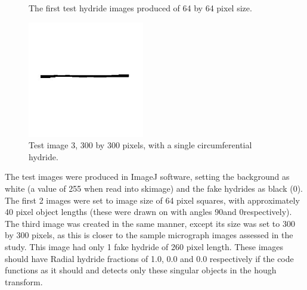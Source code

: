 \documentclass{article}
\begin{document}
\begin{figure}[h]
		\begin{center}
		\hspace{6pt} 
		\caption{The first test hydride images produced of 64 by 64 pixel size.}
		\label{TestImages64}
		\end{center}
	\end{figure}

\begin{figure}[h]
    \begin{center}
    \includegraphics[width=2.0in]{Figures/Test_3.jpg} 
    \caption{Test image 3, 300 by 300 pixels, with a single circumferential hydride.}
    \label{TestImage300}
    \end{center}
\end{figure}

The test images were produced in ImageJ software, setting the background as white (a value of 255 when read into skimage) and the fake hydrides as black (0). The first 2 images were set to image size of 64 pixel squares, with approximately 40 pixel object lengths (these were drawn on with angles 90\degree and 0\degree respectively). The third image was created in the same manner, except its size was set to 300 by 300 pixels, as this is closer to the sample micrograph images assessed in the study. This image had only 1 fake hydride of 260 pixel length. These images should have Radial hydride fractions of 1.0, 0.0 and 0.0 respectively if the code functions as it should and detects only these singular objects in the hough transform.
\end{document}
